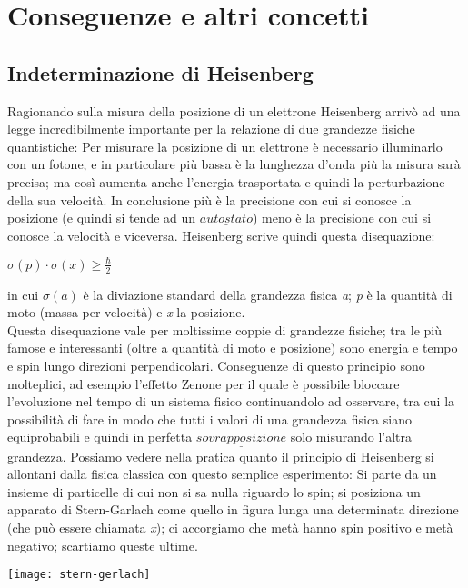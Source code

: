 \section{Conseguenze e altri concetti}
\subsection{Indeterminazione di Heisenberg}
Ragionando sulla misura della posizione di un elettrone Heisenberg arrivò ad una legge incredibilmente importante per la relazione di due grandezze fisiche quantistiche:
Per misurare la posizione di un elettrone è necessario illuminarlo con un fotone, e in particolare più bassa è la lunghezza d'onda più la misura sarà precisa; ma così aumenta anche l'energia trasportata e quindi la perturbazione della sua velocità. In conclusione più è la precisione con cui si conosce la posizione (e quindi si tende ad un $\underline{autostato}$) meno è la precisione con cui si conosce la velocità e viceversa. Heisenberg scrive quindi questa disequazione:
\begin{center} \begin{Large}
 $\sigma(\textit{p}) \cdot \sigma (\textit{x}) \geq \frac{\hbar}{2}$ \end{Large} \end{center}
in cui $\sigma(\textit{a})$ è la diviazione standard della grandezza fisica \textit{a}; \textit{p} è la quantità di moto (massa per velocità) e \textit{x} la posizione.\\
Questa disequazione vale per moltissime coppie di grandezze fisiche; tra le più famose e interessanti (oltre a quantità di moto e posizione) sono energia e tempo e spin lungo direzioni perpendicolari.
Conseguenze di questo principio sono molteplici, ad esempio l'effetto Zenone per il quale è possibile bloccare l'evoluzione nel tempo di un sistema fisico continuandolo ad osservare, tra cui la possibilità di fare in modo che tutti i valori di una grandezza fisica siano equiprobabili e quindi in perfetta $\underline{sovrapposizione}$ solo misurando l'altra grandezza.
Possiamo vedere nella pratica quanto il principio di Heisenberg si allontani dalla fisica classica con questo semplice esperimento:
Si parte da un insieme di particelle di cui non si sa nulla riguardo lo spin; si posiziona un apparato di Stern-Garlach come quello in figura lunga una determinata direzione (che può essere chiamata \textit{x}); ci accorgiamo che metà hanno spin positivo e metà negativo; scartiamo queste ultime.
\begin{center} \texttt{[image: stern-gerlach]} \end{center}
